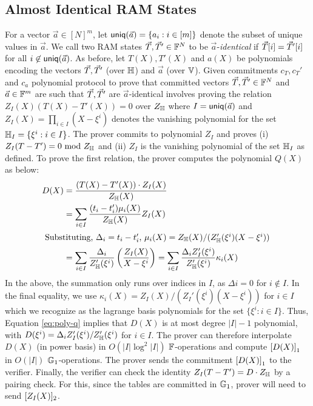 \subsection{Almost Identical RAM States}\label{subsec:proximity-ram}
For a vector $\vec{a}\in [N]^m$, let $\mathsf{uniq}(\vec{{a}})=\{a_i: i\in [m]\}$ denote the subset of unique values in $\vec{a}$. We call two
RAM states $\vec{T}, \vec{T}'\in \mathbb{F}^N$ to be $\vec{a}$-{\em identical} if $\vec{T}[i]=\vec{T}'[i]$ for all $i\not\in\mathsf{uniq}(\vec{{a}})$. As before,
let $T(X),T'(X)$ and $a(X)$ be polynomials encoding the vectors $\vec{T},\vec{T}'$ (over $\mathbb{H}$) and $\vec{a}$ (over $\mathbb{V}$). Given
commitments $c_T, c_T'$ and $c_a$ polynomial protocol to prove that committed vectors $\vec{T},\vec{T}'\in \mathbb{F}^N$ and $\vec{a}\in \mathbb{F}^m$
are such that $\vec{T},\vec{T}'$ are $\vec{a}$-identical involves proving the relation $Z_I(X)(T(X) - T'(X)) = 0$ over $Z_{\mathbb{H}}$ where
$I=\mathsf{uniq}(\vec{{a}})$ and $Z_I(X)=\prod_{i\in I}(X-\xi^i)$ denotes the vanishing polynomial for the set $\mathbb{H}_I=\{\xi^i: i\in I\}$.
The prover commits to polynomial $Z_I$ and proves (i) $Z_I(T - T') = 0 \text{ mod } Z_{\mathbb{H}}$ and (ii) $Z_I$ is the vanishing
polynomial of the set $\mathbb{H}_I$ as defined. To prove the first relation, the prover computes the polynomial $Q(X)$ as below:
\begin{align}\label{eq:poly-q}
D(X) &= \frac{(T(X)-T'(X))\cdot Z_I(X)}{Z_{\mathbb{H}}(X)} \nonumber \\
&= \sum_{i\in I}\frac{(t_i - t_i')\mu_i(X)}{Z_{\mathbb{H}}(X)} Z_I(X) \nonumber \\
\intertext{ Substituting, $\Delta_i=t_i-t_i'$, $\mu_i(X)=Z_\mathbb{H}(X)/(Z_\mathbb{H}'(\xi^i)(X-\xi^i))$ }
&=\sum_{i\in I}\frac{\Delta_i}{Z_{\mathbb{H}}'(\xi^i)}\left(\frac{Z_I(X)}{X-\xi^i}\right) = \sum_{i\in I}\frac{\Delta_i Z_I'(\xi^i)}{Z_{\mathbb{H}}'(\xi^i)}\kappa_i(X)
\end{align}
In the above, the summation only runs over indices in $I$, as $\Delta i = 0$ for $i\not\in I$. In the final equality, we use
$\kappa_i(X) = Z_I(X)/(Z_I'(\xi^i)(X-\xi^i))$ for $i\in I$ which we recognize as the lagrange basis polynomials for the set
$\{\xi^i: i\in I\}$. Thus, Equation \eqref{eq:poly-q} implies that $D(X)$ is at most degree $|I|-1$ polynomial, with
$D(\xi^i)=\Delta_i Z_I'(\xi^i)/Z_\mathbb{H}'(\xi^i)$ for $i\in I$.
The prover can therefore interpolate $D(X)$ (in power basis)
in $O(|I|\log^2 |I|)$ $\mathbb{F}$-operations and compute $\left[{D(X)}\right]_1$ in $O(|I|)$ $\mathbb{G}_1$-operations. The prover sends the
commitment $\left[{D(X)}\right]_1$ to the verifier. Finally, the verifier can
check the identity $Z_I(T - T') = D\cdot Z_{\mathbb{H}}$ by a pairing check. For this, since the tables are committed in $\mathbb{G}_1$, prover will need to send $[Z_I(X)]_2$.

